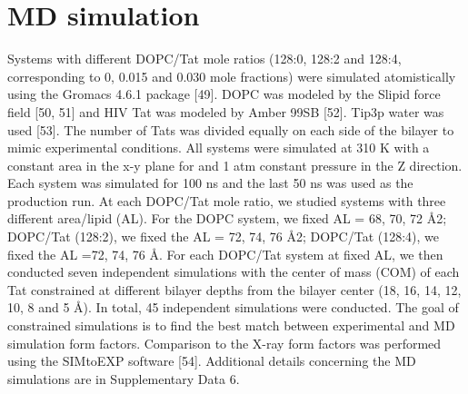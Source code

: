 \section{MD simulation}
Systems with different DOPC/Tat mole ratios (128:0, 128:2 and 128:4, corresponding to
0, 0.015 and 0.030 mole fractions) were simulated atomistically using the Gromacs 4.6.1
package [49]. DOPC was modeled by the Slipid force field [50, 51] and HIV Tat was modeled
by Amber 99SB [52]. Tip3p water was used [53]. The number of Tats was divided equally on
each side of the bilayer to mimic experimental conditions. All systems were simulated at 310 K
with a constant area in the x-y plane for and 1 atm constant pressure in the Z direction. Each
system was simulated for 100 ns and the last 50 ns was used as the production run.
At each DOPC/Tat mole ratio, we studied systems with three different area/lipid (AL).
For the DOPC system, we fixed AL = 68, 70, 72 Å2; DOPC/Tat (128:2), we fixed the AL = 72,
74, 76 Å2; DOPC/Tat (128:4), we fixed the AL =72, 74, 76 Å. For each DOPC/Tat system at
fixed AL, we then conducted seven independent simulations with the center of mass (COM) of
each Tat constrained at different bilayer depths from the bilayer center (18, 16, 14, 12, 10, 8 and
5 Å). In total, 45 independent simulations were conducted. The goal of constrained simulations
is to find the best match between experimental and MD simulation form factors. Comparison to
the X-ray form factors was performed using the SIMtoEXP software [54]. Additional details
concerning the MD simulations are in Supplementary Data 6.


